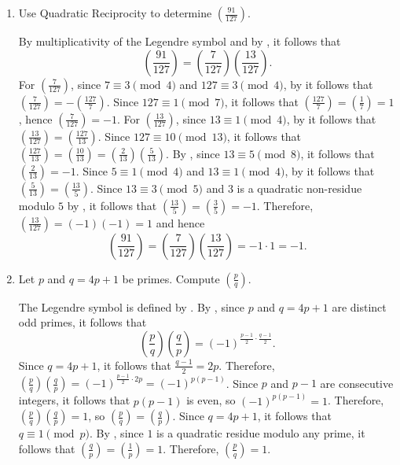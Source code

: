 \begin{enumerate}
  \item Use Quadratic Reciprocity to determine $\left(\frac{91}{127}\right)$.
  \begin{subanswer}
    By multiplicativity of the Legendre symbol and by , it follows that
    \[
    \left(\frac{91}{127}\right)=\left(\frac{7}{127}\right)\left(\frac{13}{127}\right).
    \]
    For $\left(\frac{7}{127}\right)$, since $7\equiv 3 \pmod{4}$ and $127\equiv 3 \pmod{4}$, by  it follows that $\left(\frac{7}{127}\right)= -\left(\frac{127}{7}\right)$.
    Since $127\equiv 1 \pmod{7}$, it follows that $\left(\frac{127}{7}\right)=\left(\frac{1}{7}\right)=1$, hence $\left(\frac{7}{127}\right)=-1$.
    For $\left(\frac{13}{127}\right)$, since $13\equiv 1 \pmod{4}$, by  it follows that $\left(\frac{13}{127}\right)=\left(\frac{127}{13}\right)$.
    Since $127\equiv 10 \pmod{13}$, it follows that $\left(\frac{127}{13}\right)=\left(\frac{10}{13}\right)=\left(\frac{2}{13}\right)\left(\frac{5}{13}\right)$.
    By , since $13\equiv 5 \pmod{8}$, it follows that $\left(\frac{2}{13}\right)=-1$.
    Since $5\equiv 1 \pmod{4}$ and $13\equiv 1 \pmod{4}$, by  it follows that $\left(\frac{5}{13}\right)=\left(\frac{13}{5}\right)$.
    Since $13\equiv 3 \pmod{5}$ and $3$ is a quadratic non-residue modulo $5$ by , it follows that $\left(\frac{13}{5}\right)=\left(\frac{3}{5}\right)=-1$.
    Therefore, $\left(\frac{13}{127}\right)=(-1)(-1)=1$ and hence
    \[
    \left(\frac{91}{127}\right)=\left(\frac{7}{127}\right)\left(\frac{13}{127}\right)=-1\cdot 1=-1.
    \]
  \end{subanswer}
  
  \item Let $p$ and $q=4 p+1$ be primes. Compute $\left(\frac{p}{q}\right)$.
  \begin{subanswer}
    The Legendre symbol is defined by .
    By , since $p$ and $q = 4p+1$ are distinct odd primes, it follows that
    \[
    \left(\frac{p}{q}\right)\left(\frac{q}{p}\right) = (-1)^{\frac{p-1}{2}\cdot\frac{q-1}{2}}.
    \]
    Since $q = 4p+1$, it follows that $\frac{q-1}{2} = 2p$.
    Therefore, $\left(\frac{p}{q}\right)\left(\frac{q}{p}\right) = (-1)^{\frac{p-1}{2}\cdot 2p} = (-1)^{p(p-1)}$.
    Since $p$ and $p-1$ are consecutive integers, it follows that $p(p-1)$ is even, so $(-1)^{p(p-1)} = 1$.
    Therefore, $\left(\frac{p}{q}\right)\left(\frac{q}{p}\right) = 1$, so $\left(\frac{p}{q}\right) = \left(\frac{q}{p}\right)$.
    Since $q = 4p+1$, it follows that $q \equiv 1 \pmod{p}$.
    By , since $1$ is a quadratic residue modulo any prime, it follows that $\left(\frac{q}{p}\right) = \left(\frac{1}{p}\right) = 1$.
    Therefore, $\left(\frac{p}{q}\right) = 1$.
  \end{subanswer}








\end{enumerate}
